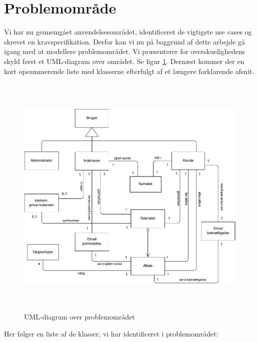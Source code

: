 \documentclass[12pt]{article}   %
\begin{document}
\section{Problemområde}
Vi har nu gennemgået anvendelsesområdet, identificeret de vigtigste use cases og skrevet en kravspecifikation. Derfor kan vi nu på baggrund af dette arbejde gå igang med at modellere problemområdet. Vi præsenterer for overskuelighedens skyld først et UML-diagram over området. Se figur \ref{fig:problem}. Dernæst kommer der en kort opsummerende liste med klasserne efterfulgt af et længere forklarende afsnit.  

\begin{figure}[!ht]
\begin{center}
\includegraphics[width=12cm, height=12cm]{problemomr.pdf}
\caption{UML-diagram over problemområdet}
\label{fig:problem}
\end{center}
\end{figure}

Her følger en liste af de klasser, vi har identificeret i problemområdet:
\end{document}
